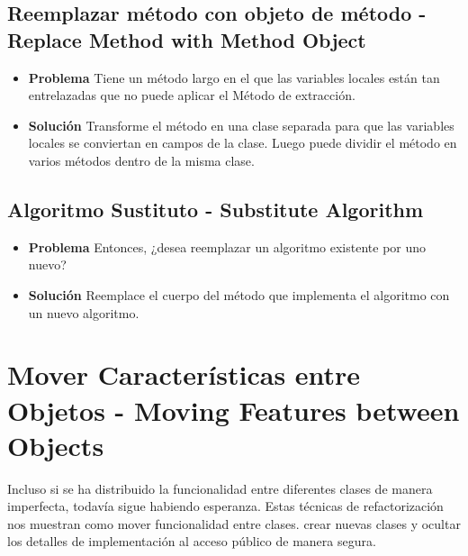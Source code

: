 \documentclass[11pt,a4paper,oneside]{book}
\begin{document}
\subsection{Reemplazar método con objeto de método - Replace Method with Method Object}
\label{replacemethodwithmethodobject}
\begin{itemize}
    \item \textbf{Problema} Tiene un método largo en el que las variables locales están tan entrelazadas que no puede aplicar el Método de extracción.
    
    \item \textbf{Solución} Transforme el método en una clase separada para que las variables locales se conviertan en campos de la clase. Luego puede dividir el método en varios métodos dentro de la misma clase.
    
\end{itemize}

\subsection{Algoritmo Sustituto - Substitute Algorithm}
\label{substitutealgorithm}
\begin{itemize}
    \item \textbf{Problema} Entonces, ¿desea reemplazar un algoritmo existente por uno nuevo?
    
    \item \textbf{Solución} Reemplace el cuerpo del método que implementa el algoritmo con un nuevo algoritmo.
    
\end{itemize}



\section{Mover Características entre Objetos - Moving Features between Objects}

\label{renombrarmetodo} Incluso si se ha distribuido la funcionalidad entre diferentes clases de manera imperfecta, todavía sigue habiendo esperanza.
Estas técnicas de refactorización nos muestran como mover funcionalidad entre clases. crear nuevas clases y ocultar los detalles de implementación al acceso público de manera segura.
\end{document}
